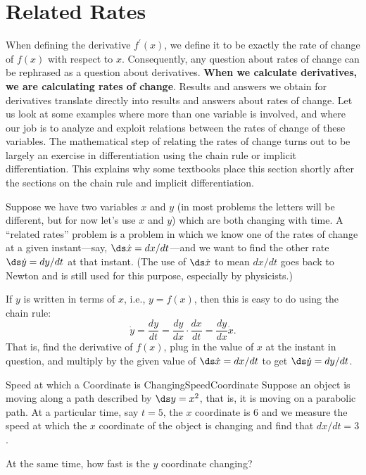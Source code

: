 \section{Related Rates}\label{sec:RelatedRates}
When defining the derivative $f^{\prime}\left( x\right)$,
we define it to be exactly the rate of change of $%
f\left( x\right) $ with respect to $x$. Consequently, any question about
rates of change can be rephrased as a question about derivatives.
\textbf{When we calculate derivatives, we are calculating rates of change}. Results
and answers we obtain for derivatives translate directly into results and
answers about rates of change. Let us look at
some examples where more than one variable is involved, and where our job is to
analyze and exploit relations between the rates of change of these
variables. The mathematical step of relating the rates of change turns out
to be largely an exercise in differentiation using the chain rule or
implicit differentiation. This explains why some textbooks place this
section shortly after the sections on the chain rule and implicit
differentiation.

Suppose we have two variables $x$ and $y$ (in most problems the
letters will be different, but for now let's use $x$ and $y$) which
are both changing with time.  A ``related rates'' problem is a problem
in which we know one of the rates of change at a given instant---say,
$\ds \dot x = dx/dt$---and we want to find the other rate $\ds \dot y = dy/dt$ at that
instant. (The use of $\ds \dot x$ to mean $dx/dt$ goes back to Newton and
is still used for this purpose, especially by physicists.)

If $y$ is written in terms of $x$, i.e., $y=f(x)$, then this is easy
to do using the chain rule:
$$\dot y = \frac{dy}{dt}=\frac{dy}{dx}\cdot\frac{dx}{dt}=\frac{dy}{dx}\dot x.$$
That is, find the derivative of $f(x)$, plug in the value of
$x$ at the instant in question, and multiply by the given value of
$\ds \dot{x}=dx/dt$ to get $\ds \dot{y}=dy/dt$.

\begin{example}{Speed at which a Coordinate is Changing}{SpeedCoordinate}
Suppose an object is moving along a path described by $\ds y=x^2$, that
is, it is moving on a parabolic path. At a particular time, say $t=5$,
the $x$ coordinate is 6 and we measure the speed at which the $x$ coordinate of the object is
changing and find that $dx/dt = 3$. 

At the same time, how fast is the $y$ coordinate changing?
\end{example}

